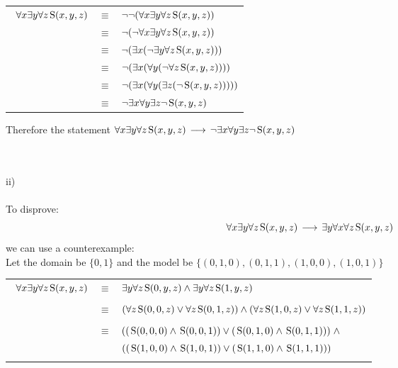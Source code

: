 \documentclass{article}
\newcommand{\predS}{\hspace{0.05cm} \textnormal{S}}
\newcommand{\predicate}{\predS (x,y,z)}
\newcommand{\impgap}{\hspace{0.05cm}}
\newcommand{\imp}{\impgap \longrightarrow \impgap}
\begin{document}
\begin{enumerate}
{    \begin{center}\begin{tabular}{ccl}\
    $\forall x \exists y \forall z \predicate$ & $\equiv$ & $\lnot \lnot(\forall x \exists y \forall z \predicate)$ \\
    & $\equiv$ & $\lnot (\lnot \forall x \exists y \forall z \predicate)$ \\
    & $\equiv$ & $\lnot(\exists x (\lnot \exists y \forall z \predicate))$ \\
    & $\equiv$ & $\lnot(\exists x (\forall y (\lnot \forall z \predicate)))$ \\
    & $\equiv$ & $\lnot(\exists x (\forall y (\exists z (\lnot \predicate))))$ \\
    & $\equiv$ & $\lnot\exists x \forall y \exists z \lnot \predicate$ \\
    \end{tabular}\end{center}
    Therefore the statement $\forall x \exists y \forall z \predicate \imp \lnot\exists x \forall y \exists z \lnot \predicate$
    } \\ \\

    ii) \\ \\
    {
    To disprove:
    $$\forall x \exists y \forall z \predicate \imp \exists y \forall x \forall z \predicate$$
    we can use a counterexample: \\

    Let the domain be $\{0, 1\}$ and the model be $\{(0,1,0), (0,1,1), (1,0,0), (1,0,1)\}$
    }
    {
    \begin{center}\begin{tabular}{ccl}\
    $\forall x \exists y \forall z \predicate$ & $\equiv$ & $\exists y \forall z \predS(0,y,z) \land \exists y \forall z \predS(1,y,z)$ \\ \\
    
    & $\equiv$ & $(\forall z \predS(0,0,z) \lor \forall z \predS(0,1,z)) \land (\forall z \predS(1,0,z) \lor \forall z \predS(1,1,z))$ \\ \\
    
    & $\equiv$ & $((\predS(0,0,0) \land \predS(0,0,1)) \lor (\predS(0,1,0) \land \predS(0,1,1))) \hspace{0.1cm} \land$ \\
    & & $((\predS(1,0,0) \land \predS(1,0,1)) \lor (\predS(1,1,0) \land \predS(1,1,1)))$ \\ \\
    

\end{tabular}
\end{center}}
\end{enumerate}
\end{document}
